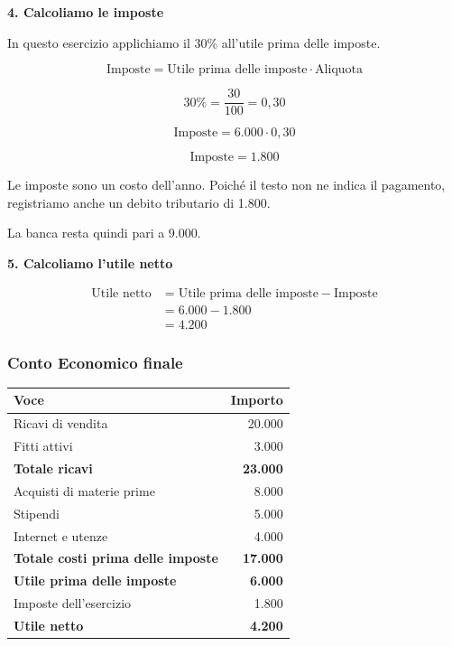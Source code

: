 \medskip

\noindent \textbf{4. Calcoliamo le imposte}

\noindent In questo esercizio applichiamo
il 30\% all'utile prima delle imposte.

\[
\boxed{
\text{Imposte}
=
\text{Utile prima delle imposte}
\cdot\text{Aliquota}
}
\]

\[
30\%=\frac{30}{100}=0{,}30
\]

\[
\text{Imposte}=6.000\cdot0{,}30
\]

\[
\boxed{\text{Imposte}=1.800}
\]

\noindent Le imposte sono un costo dell'anno.
Poiché il testo non ne indica il pagamento,
registriamo anche un debito tributario di 1.800.

\noindent La banca resta quindi pari a 9.000.

\medskip

\noindent \textbf{5. Calcoliamo l'utile netto}

\[
\begin{aligned}
\text{Utile netto}
&=\text{Utile prima delle imposte}-\text{Imposte}\\
&=6.000-1.800\\
&=\boxed{4.200}
\end{aligned}
\]

\subsubsection*{Conto Economico finale}

\begin{center}
    \begin{tabular}{|l|r|}
        \hline
        \textbf{Voce} & \textbf{Importo} \\
        \hline
        Ricavi di vendita & 20.000 \\
        Fitti attivi & 3.000 \\
        \hline
        \textbf{Totale ricavi} & \textbf{23.000} \\
        \hline
        Acquisti di materie prime & 8.000 \\
        Stipendi & 5.000 \\
        Internet e utenze & 4.000 \\
        \hline
        \textbf{Totale costi prima delle imposte}
        & \textbf{17.000} \\
        \hline
        \textbf{Utile prima delle imposte}
        & \textbf{6.000} \\
        Imposte dell'esercizio & 1.800 \\
        \hline
        \textbf{Utile netto} & \textbf{4.200} \\
        \hline
    \end{tabular}
\end{center}

